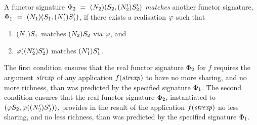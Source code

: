 A functor signature
$\funsig_2\ =\ \longfunsig{2}$ {\sl matches} another functor signature,
$\funsig_1\ =\ \longfunsig{1}$, if there exists a realisation $\varphi$ 
such that
\begin{enumerate}
\item $(N_{1})S_{1}$ matches $(N_{2})S_{2}$ via $\varphi$, and
\item $\varphi((N_2')S_2')$ matches $(N_1')S_1'$.
\end{enumerate}
The first condition ensures that the real functor signature $\Phi_2$
for $f$ requires the argument ${\it strexp}$ of any application $f({\it strexp})$
to have no more sharing, and no more richness, than was predicted by
the specified signature $\Phi_1$.
The second condition ensures that the real functor signature $\Phi_2$,
instantiated to $(\varphi S_2,\varphi((N_2')S_2'))$, provides in the result of
the application $f({\it strexp})$
no less sharing, and no less richness, than was predicted by
the specified signature $\Phi_1$.



